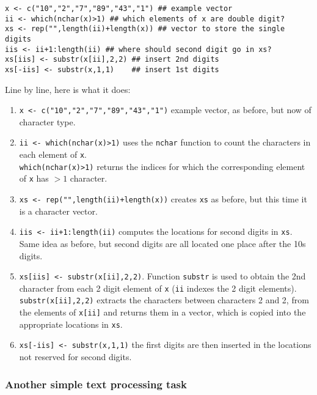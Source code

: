 \documentclass[10pt] {article}
\theoremstyle{definition}
\begin{document}
\begin{lstlisting}
x <- c("10","2","7","89","43","1") ## example vector
ii <- which(nchar(x)>1) ## which elements of x are double digit?
xs <- rep("",length(ii)+length(x)) ## vector to store the single digits
iis <- ii+1:length(ii) ## where should second digit go in xs?
xs[iis] <- substr(x[ii],2,2) ## insert 2nd digits
xs[-iis] <- substr(x,1,1)    ## insert 1st digits
\end{lstlisting}
Line by line, here is what it does:
\begin{enumerate}
\item \lstinline+x <- c("10","2","7","89","43","1")+ example vector, as before, but now of character type.
\item \lstinline+ii <- which(nchar(x)>1)+ uses the {\tt nchar} function to count the characters in each element of {\tt x}.\\ \lstinline+which(nchar(x)>1)+ returns the indices for which the corresponding element of {\tt x} has $>1$ character.
\item  \lstinline^xs <- rep("",length(ii)+length(x))^ creates {\tt xs} as before, but this time it is a character vector.
\item \lstinline^iis <- ii+1:length(ii)^ computes the locations for second digits in {\tt xs}. Same idea as before, but second digits are all located one place after the 10s digits.
\item \lstinline+xs[iis] <- substr(x[ii],2,2)+. Function \lstinline+substr+ is used to obtain the 2nd character from each 2 digit element of {\tt x} ({\tt ii} indexes the 2 digit elements). \lstinline+substr(x[ii],2,2)+ extracts the characters between characters 2 and 2, from the elements of {\tt x[ii]} and returns them in a vector, which is copied into the appropriate locations in {\tt xs}.
\item \lstinline+xs[-iis] <- substr(x,1,1)+ the first digits are then inserted in the locations not reserved for second digits. 
\end{enumerate}

\subsubsection{Another simple text processing task}
\end{document}
